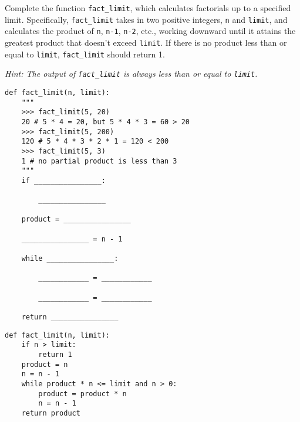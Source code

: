 \begin{blocksection}
\question Complete the function \lstinline{fact_limit}, which calculates factorials up to a specified limit. Specifically, \lstinline{fact_limit} takes in two positive integers, \lstinline{n} and \lstinline{limit}, and calculates the product of \lstinline{n}, \lstinline{n-1}, \lstinline{n-2}, etc., working downward until it attains the greatest product that doesn't exceed \lstinline{limit}. If there is no product less than or equal to \lstinline{limit}, \lstinline{fact_limit} should return 1. 

\emph{Hint: The output of \lstinline{fact_limit} is always less than or equal to \lstinline{limit}.}

\begin{lstlisting}
def fact_limit(n, limit):
    """
    >>> fact_limit(5, 20) 
    20 # 5 * 4 = 20, but 5 * 4 * 3 = 60 > 20
    >>> fact_limit(5, 200) 
    120 # 5 * 4 * 3 * 2 * 1 = 120 < 200
    >>> fact_limit(5, 3) 
    1 # no partial product is less than 3
    """
    if ________________:

        ________________

    product = ________________

    ________________ = n - 1

    while ________________:

        ____________ = ____________  

        ____________ = ____________
        
    return ________________

\end{lstlisting}
\end{blocksection}

\begin{blocksection}
\begin{solution}
\begin{lstlisting}
def fact_limit(n, limit):
    if n > limit:
        return 1
    product = n
    n = n - 1
    while product * n <= limit and n > 0:
        product = product * n  
        n = n - 1
    return product
\end{lstlisting}
\end{solution}
\end{blocksection}